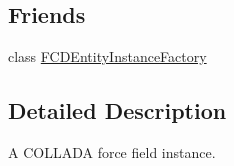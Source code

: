 \subsection*{Friends}
\begin{DoxyCompactItemize}
\item 
\hypertarget{classFCDPhysicsForceFieldInstance_a069ebb98497ccbc5fdcb75ecfa8b15f7}{
class \hyperlink{classFCDPhysicsForceFieldInstance_a069ebb98497ccbc5fdcb75ecfa8b15f7}{FCDEntityInstanceFactory}}
\label{classFCDPhysicsForceFieldInstance_a069ebb98497ccbc5fdcb75ecfa8b15f7}

\end{DoxyCompactItemize}


\subsection{Detailed Description}
A COLLADA force field instance. 

